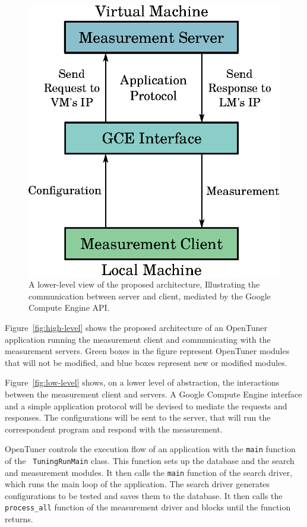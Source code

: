 \documentclass[a4paper, 12pt]{article}
\begin{document}
\begin{figure}[htpb]
\begin{minipage}{.45\textwidth}
        \includegraphics[scale=.62]{low-level-implementation}
        \caption{A lower-level view of the proposed architecture,
        Illustrating the communication between server and client,
        mediated by the Google Compute Engine API.
        }
        \label{fig:low-level}
    \end{minipage}%
    \label{fig:archs}
\end{figure}

Figure~\ref{fig:high-level} shows the proposed architecture of an OpenTuner
application running the measurement client and communicating with the
measurement servers.  Green boxes in the figure represent OpenTuner modules
that will not be modified, and blue boxes represent new or modified modules.

Figure~\ref{fig:low-level} shows, on a lower level of abstraction, the
interactions between the measurement client and servers. A Google Compute
Engine interface and a simple application protocol will be devised to mediate
the requests and responses.  The configurations will be sent to the server,
that will run the correspondent program and respond with the measurement.

OpenTuner controls the execution flow of an application with the
\texttt{\footnotesize main} function of the \texttt{\footnotesize
TuningRunMain} class. This function sets up the database and the search and
measurement modules. It then calls the \texttt{\footnotesize main}
function of the search driver, which runs the main loop of the application.
The search driver generates configurations to be tested and saves
them to the database. It then calls the \texttt{\footnotesize process\_all}
function of the measurement driver and blocks until the function returns.
\end{document}
